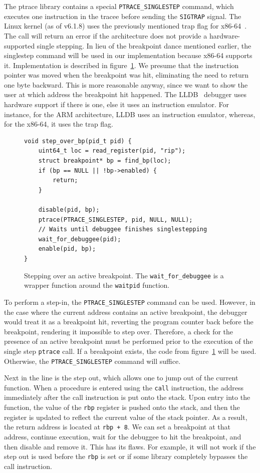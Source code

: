 The ptrace library contains a special \texttt{PTRACE\_SINGLESTEP} command,
which executes one instruction in the tracee before sending the
\texttt{SIGTRAP} signal. The Linux kernel (as of v6.1.8) uses the previously
mentioned trap flag for x86-64~\cite{linuxkernel-trapflag}. The call will
return an error if the architecture does not provide a hardware-supported
single stepping. In lieu of the breakpoint dance mentioned earlier, the
singlestep command will be used in our implementation because x86-64 supports
it. Implementation is described in figure~\ref{fig:singlestep}. We presume that
the instruction pointer was moved when the breakpoint was hit, eliminating the
need to return one byte backward. This is more reasonable anyway, since we want
to show the user at which address the breakpoint hit happened. The
LLDB~\cite{lldb} debugger uses hardware support if there is one, else it uses
an instruction emulator. For instance, for the ARM architecture, LLDB uses an
instruction emulator, whereas, for the x86-64, it uses the trap flag.

\begin{figure}
    \begin{verbatim}
void step_over_bp(pid_t pid) {
    uint64_t loc = read_register(pid, "rip");
    struct breakpoint* bp = find_bp(loc);
    if (bp == NULL || !bp->enabled) {
        return;
    }

    disable(pid, bp);
    ptrace(PTRACE_SINGLESTEP, pid, NULL, NULL);
    // Waits until debuggee finishes singlestepping
    wait_for_debuggee(pid);
    enable(pid, bp);
}
    \end{verbatim}
    \caption{Stepping over an active breakpoint. The \texttt{wait\_for\_debuggee}
    is a wrapper function around the \texttt{waitpid} function.}
    \label{fig:singlestep}
\end{figure}

To perform a step-in, the \verb|PTRACE_SINGLESTEP| command can be used.
However, in the case where the current address contains an active breakpoint,
the debugger would treat it as a breakpoint hit, reverting the program counter
back before the breakpoint, rendering it impossible to step over. Therefore, a
check for the presence of an active breakpoint must be performed prior to the
execution of the single step \texttt{ptrace} call. If a breakpoint exists, the
code from figure~\ref{fig:singlestep} will be used. Otherwise, the
\verb|PTRACE_SINGLESTEP| command will suffice.

Next in the line is the step out, which allows one to jump out of the current
function. When a procedure is entered using the \texttt{call} instruction, the
address immediately after the call instruction is put onto the stack. Upon
entry into the function, the value of the \texttt{rbp} register is pushed onto
the stack, and then the register is updated to reflect the current value of the
stack pointer. As a result, the return address is located at \texttt{rbp + 8}.
We can set a breakpoint at that address, continue execution, wait for the
debuggee to hit the breakpoint, and then disable and remove it. This has its
flaws. For example, it will not work if the step out is used before the
\texttt{rbp} is set or if some library completely bypasses the call
instruction.

